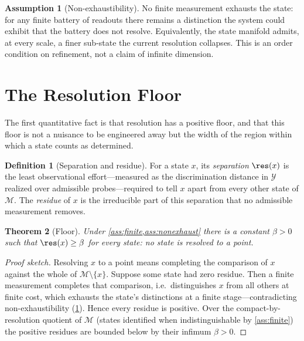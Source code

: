 \documentclass[11pt,a4paper]{article}
\theoremstyle{thmstyle}
\newtheorem{theorem}{Theorem}[section]
\theoremstyle{definition}
\newtheorem{definition}[theorem]{Definition}
\newtheorem{assumption}{Assumption}
\theoremstyle{remark}
\newcommand{\Man}{\mathcal{M}}          %
\newcommand{\st}{x}                     %
\newcommand{\flo}{\beta}                %
\newcommand{\set}[1]{\{#1\}}
\begin{document}
\begin{assumption}[Non-exhaustibility]
\label{ass:nonexhaust}
No finite measurement exhausts the state: for any finite battery of
readouts there remains a distinction the system could exhibit that the
battery does not resolve. Equivalently, the state manifold admits, at every
scale, a finer sub-state the current resolution collapses. This is an order
condition on refinement, not a claim of infinite dimension.
\end{assumption}

\section{The Resolution Floor}
\label{sec:floor}

The first quantitative fact is that resolution has a positive floor, and
that this floor is not a nuisance to be engineered away but the width of
the region within which a state counts as determined.

\begin{definition}[Separation and residue]
\label{def:residue}
For a state $\st$, its \emph{separation} $\res(\st)$ is the least
observational effort---measured as the discrimination distance in
$\mathcal{Y}$ realized over admissible probes---required to tell $\st$
apart from every other state of $\Man$. The \emph{residue} of $\st$ is the
irreducible part of this separation that no admissible measurement removes.
\end{definition}

\begin{theorem}[Floor]
\label{thm:floor}
Under \cref{ass:finite,ass:nonexhaust} there is a constant $\flo>0$ such
that $\res(\st)\ge\flo$ for every state: no state is resolved to a point.
\end{theorem}

\begin{proof}[Proof sketch]
Resolving $\st$ to a point means completing the comparison of $\st$
against the whole of $\Man\setminus\set{\st}$. Suppose some state had zero
residue. Then a finite measurement completes that comparison, i.e.\
distinguishes $\st$ from all others at finite cost, which exhausts the
state's distinctions at a finite stage---contradicting non-exhaustibility
(\cref{ass:nonexhaust}). Hence every residue is positive. Over the
compact-by-resolution quotient of $\Man$ (states identified when
indistinguishable by \cref{ass:finite}) the positive residues are bounded
below by their infimum $\flo>0$.
\end{proof}
\end{document}
